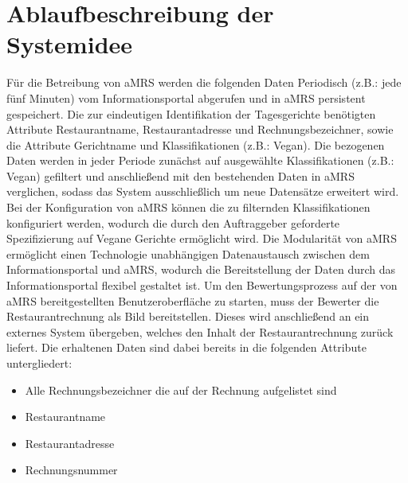\section{Ablaufbeschreibung der Systemidee}
Für die Betreibung von \ac{aMRS} werden die folgenden Daten Periodisch (z.B.: jede fünf Minuten) vom Informationsportal abgerufen und in \ac{aMRS} persistent gespeichert.
Die zur eindeutigen Identifikation der Tagesgerichte benötigten Attribute Restaurantname, Restaurantadresse und Rechnungsbezeichner, sowie die Attribute Gerichtname und Klassifikationen (z.B.: Vegan).
Die bezogenen Daten werden in jeder Periode zunächst auf ausgewählte Klassifikationen (z.B.: Vegan) gefiltert und anschließend mit den bestehenden Daten in \ac{aMRS} verglichen, sodass das System ausschließlich um neue Datensätze erweitert wird.
Bei der Konfiguration von \ac{aMRS} können die zu filternden Klassifikationen konfiguriert werden, wodurch die durch den Auftraggeber geforderte Spezifizierung auf Vegane Gerichte ermöglicht wird.
\newparagraph
Die Modularität von \ac{aMRS} ermöglicht einen Technologie unabhängigen Datenaustausch zwischen dem Informationsportal und \ac{aMRS}, wodurch die Bereitstellung der Daten durch das Informationsportal flexibel gestaltet ist.
\newparagraph
Um den Bewertungsprozess auf der von \ac{aMRS} bereitgestellten Benutzeroberfläche zu starten, muss der Bewerter die Restaurantrechnung als Bild bereitstellen.
Dieses wird anschließend an ein externes System übergeben, welches den Inhalt der Restaurantrechnung zurück liefert.
Die erhaltenen Daten sind dabei bereits in die folgenden Attribute untergliedert: 
\begin{itemize}
  \item Alle Rechnungsbezeichner die auf der Rechnung aufgelistet sind
  \item Restaurantname
  \item Restaurantadresse
  \item Rechnungsnummer
\end{itemize}
